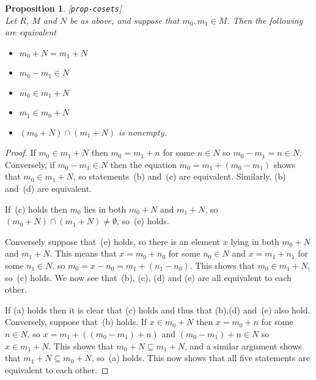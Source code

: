 \documentclass{amsart}
\newcommand{\lbl}[1]{\label{#1}\textup{[\texttt{#1}]}\ \\}
\newcommand{\lbl}{\label}
\newcommand{\sse}       {\subseteq}
\renewcommand{\:}{\colon}
\newtheorem{proposition}[theorem]{Proposition}
\theoremstyle{definition}
\begin{document}
\begin{proposition}\lbl{prop-cosets}
 Let $R$, $M$ and $N$ be as above, and suppose that $m_0,m_1\in M$.
 Then the following are equivalent
 \begin{itemize}
 \item[(a)] $m_0+N=m_1+N$
 \item[(b)] $m_0-m_1\in N$ 
 \item[(c)] $m_0\in m_1+N$
 \item[(d)] $m_1\in m_0+N$
 \item[(e)] $(m_0+N)\cap(m_1+N)$ is nonempty.
 \end{itemize}
\end{proposition}
\begin{proof}
 If $m_0\in m_1+N$ then $m_0=m_1+n$ for some $n\in N$ so
 $m_0-m_1=n\in N$.  Conversely, if $m_0-m_1\in N$ then the equation
 $m_0=m_1+(m_0-m_1)$ shows that $m_0\in m_1+N$, so statements~(b)
 and~(c) are equivalent.  Similarly, (b) and~(d) are equivalent.  

 If~(c) holds then $m_0$ lies in both $m_0+N$ and $m_1+N$, so
 $(m_0+N)\cap(m_1+N)\neq\emptyset$, so~(e) holds.  

 Conversely suppose that~(e) holds, so there is an element $x$ lying
 in both $m_0+N$ and $m_1+N$.  This means that $x=m_0+n_0$ for some
 $n_0\in N$ and $x=m_1+n_1$ for some $n_1\in N$, so
 $m_0=x-n_0=m_1+(n_1-n_0)$.  This shows that $m_0\in m_1+N$, so~(c)
 holds.  We now see that~(b), (c), (d) and (e) are all equivalent to
 each other.

 If (a) holds then it is clear that (c) holds and thus that (b),(d)
 and~(e) also hold.  Conversely, suppose that~(b) holds.  If
 $x\in m_0+N$ then $x=m_0+n$ for some $n\in N$, so
 $x=m_1+((m_0-m_1)+n)$ and $(m_0-m_1)+n\in N$ so $x\in m_1+N$.  This
 shows that $m_0+N\sse m_1+N$, and a similar argument shows that
 $m_1+N\sse m_0+N$, so~(a) holds.  This now shows that all five
 statements are equivalent to each other.
\end{proof}
\end{document}
